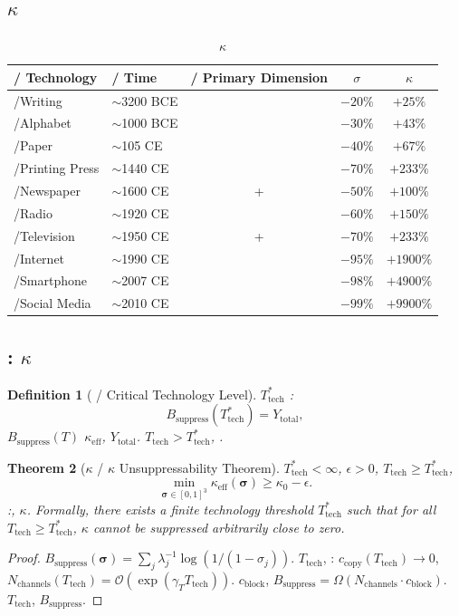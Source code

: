 \documentclass[11pt,a4paper]{article}
\newtheorem{theorem}{Theorem}[section]
\newtheorem{definition}[theorem]{Definition}
\theoremstyle{definition}
\newcommand{\coupling}{\kappa}
\newcommand{\suppress}{\sigma}
\newcommand{\calO}{\mathcal{O}}
\begin{document}
\subsection{ $\coupling$}
\begin{table}[htbp]
\centering
\caption{ $\coupling$}
\label{tab:tech}
\begin{tabular}{@{}lp{5cm}ccc@{}}
\toprule
\textbf{ / Technology} &
\textbf{ / Time} &
\textbf{ / Primary Dimension} &
\textbf{$\suppress$ } &
\textbf{$\coupling$ } \\
\midrule
/Writing & $\sim$3200 BCE & & $-20\%$ & $+25\%$ \\
/Alphabet & $\sim$1000 BCE & & $-30\%$ & $+43\%$ \\
/Paper & $\sim$105 CE & & $-40\%$ & $+67\%$ \\
/Printing Press & $\sim$1440 CE & & $-70\%$ & $+233\%$ \\
/Newspaper & $\sim$1600 CE & + & $-50\%$ & $+100\%$ \\
/Radio & $\sim$1920 CE & & $-60\%$ & $+150\%$ \\
/Television & $\sim$1950 CE & + & $-70\%$ & $+233\%$ \\
/Internet & $\sim$1990 CE &  & $-95\%$ & $+1900\%$ \\
/Smartphone & $\sim$2007 CE &  & $-98\%$ & $+4900\%$ \\
/Social Media & $\sim$2010 CE &  & $-99\%$ & $+9900\%$ \\
\bottomrule
\end{tabular}
\end{table}
\subsection{: $\coupling$}
\begin{definition}[ / Critical Technology Level]
\label{def:critical}
 $T_{\text{tech}}^*$ : 
\[
B_{\text{suppress}}(T_{\text{tech}}^*) = Y_{\text{total}},
\]
 $B_{\text{suppress}}(T)$ $\coupling_{\text{eff}}$, 
$Y_{\text{total}}$.
 $T_{\text{tech}} > T_{\text{tech}}^*$, .
\end{definition}
\begin{theorem}[$\coupling$ / $\coupling$ Unsuppressability Theorem]
\label{thm:unsuppressable}
 $T_{\text{tech}}^* < \infty$, $\epsilon > 0$, 
 $T_{\text{tech}} \geq T_{\text{tech}}^*$, 
\[
\min_{\bm{\suppress} \in [0,1]^3} \coupling_{\text{eff}}(\bm{\suppress})
 \geq \coupling_0 - \epsilon.
\]
:, $\coupling$.
Formally, there exists a finite technology threshold $T_{\text{tech}}^*$ such that
for all $T_{\text{tech}} \geq T_{\text{tech}}^*$, $\coupling$ cannot be suppressed
arbitrarily close to zero.
\end{theorem}
\begin{proof}
 $B_{\text{suppress}}(\bm{\suppress}) = \sum_j \lambda_j^{-1} \log(1/(1-\suppress_j))$.
 $T_{\text{tech}}$, : 
$c_{\text{copy}}(T_{\text{tech}}) \to 0$, 
$N_{\text{channels}}(T_{\text{tech}}) = \calO(\exp(\gamma_T T_{\text{tech}}))$.
 $c_{\text{block}}$, 
 $B_{\text{suppress}} = \Omega(N_{\text{channels}} \cdot c_{\text{block}})$.
 $T_{\text{tech}}$, $B_{\text{suppress}}$.
\end{proof}
\end{document}
